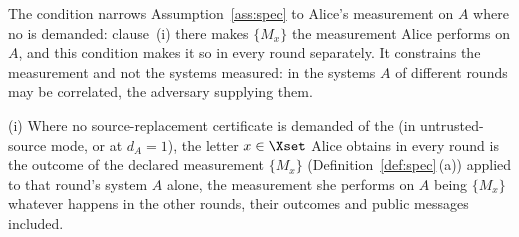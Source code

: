 
The condition narrows Assumption~\ref{ass:spec} to Alice's measurement on
$A$ where no  is demanded: clause~(i)
there makes $\{M_x\}$ the measurement Alice performs on $A$, and this
condition makes it so in every round separately. It constrains the
measurement and not the systems measured: in  the
systems $A$ of different rounds may be correlated, the adversary supplying
them.

\begin{assumption}\label{ass:alice-meas}
(i) Where no source-replacement certificate is demanded of the
 (in untrusted-source mode, or at $d_A=1$), the
letter $x\in\Xset$ Alice obtains in every round is the outcome of the
declared measurement $\{M_x\}$ (Definition~\ref{def:spec}\,(a)) applied to
that round's system $A$ alone, the measurement she performs on $A$ being
$\{M_x\}$ whatever happens in the other rounds, their outcomes and public
messages included.
\end{assumption}
